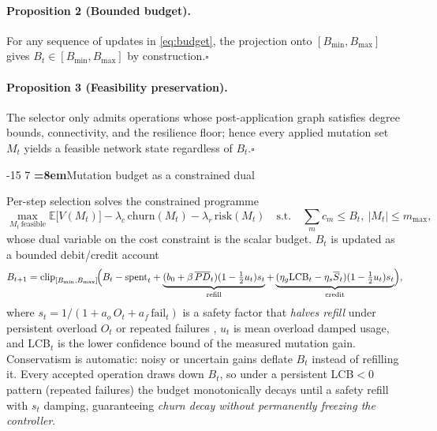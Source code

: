\documentclass[runningheads]{llncs}
\makeatletter
\renewcommand\subsection{\@startsection{subsection}{2}{\z@}%
  {-15\p@ \@plus -4\p@ \@minus -4\p@}%
  {7\p@ \@plus 4\p@ \@minus 4\p@}%
  {\normalfont\normalsize\bfseries\boldmath\color{vitblue}%
   \rightskip=\z@ \@plus 8em\pretolerance=10000}}
\makeatother
\begin{document}
\paragraph{Proposition 2 (Bounded budget).}
For any sequence of updates in \eqref{eq:budget}, the projection onto
$[B_{\min}, B_{\max}]$ gives $B_t \in [B_{\min}, B_{\max}]$ by construction.\hfill$\square$

\paragraph{Proposition 3 (Feasibility preservation).}
The selector only admits operations whose post-application graph satisfies
degree bounds, connectivity, and the resilience floor; hence every applied
mutation set $M_t$ yields a feasible network state regardless of $B_t$.\hfill$\square$

\subsection{Mutation budget as a constrained dual}
\label{sec:model-budget}

Per-step selection solves the constrained programme
\begin{equation}
\max_{M_t\ \text{feasible}} \mathbb{E}\bigl[V(M_t)\bigr] - \lambda_c\,
\text{churn}(M_t) - \lambda_r\,\text{risk}(M_t)
\quad \text{s.t.} \quad \textstyle\sum_{m} c_m \le B_t,\ |M_t| \le m_{\max},
\label{eq:constrained}
\end{equation}
whose dual variable on the cost constraint is the scalar budget. $B_t$ is
updated as a bounded debit/credit account
\begin{equation}
B_{t+1} = \mathrm{clip}_{[B_{\min}, B_{\max}]}\!\Bigl(B_t - \text{spent}_t
+ \underbrace{(b_0 + \beta\,\overline{PD}_t)(1 - \tfrac12 u_t)s_t}_\text{refill}
+ \underbrace{(\eta_g \text{LCB}_t - \eta_s\overline{S}_t)(1 - \tfrac12 u_t)s_t}_\text{credit}\Bigr),
\label{eq:budget}
\end{equation}
where $s_t = 1/(1 + a_o\,O_t + a_f\,\text{fail}_t)$ is a safety factor that
\emph{halves refill} under persistent overload $O_t$ or repeated failures
\cite{alhiyari2025}, $u_t$ is mean overload damped usage, and LCB$_t$ is
the lower confidence bound of the measured mutation gain. Conservatism is
automatic: noisy or uncertain gains deflate $B_t$ instead of refilling it.
Every accepted operation draws down $B_t$, so under a persistent LCB$< 0$
pattern (repeated failures) the budget monotonically decays until a safety
refill with $s_t$ damping, guaranteeing \emph{churn decay without
permanently freezing the controller}.
\end{document}
